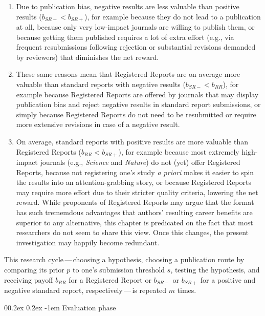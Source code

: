 \documentclass[british,,man,floatsintext]{apa6}
\makeatletter
\providecommand{\tightlist}{%
  \setlength{\itemsep}{0pt}\setlength{\parskip}{0pt}}
\renewcommand{\paragraph}{\@startsection{paragraph}{4}{\parindent}%
  {0\baselineskip \@plus 0.2ex \@minus 0.2ex}%
  {-1em}%
  {\normalfont\normalsize\bfseries\itshape\typesectitle}}
\makeatother
\begin{document}
\begin{enumerate}
\def\labelenumi{\arabic{enumi}.}
\tightlist
\item
  Due to publication bias, negative results are less valuable than positive results (\(b_{SR-} < b_{SR+}\)), for example because they do not lead to a publication at all, because only very low-impact journals are willing to publish them, or because getting them published requires a lot of extra effort (e.g., via frequent resubmissions following rejection or substantial revisions demanded by reviewers) that diminishes the net reward.
\item
  These same reasons mean that Registered Reports are on average more valuable than standard reports with negative results (\(b_{SR-} < b_{RR}\)), for example because Registered Reports are offered by journals that may display publication bias and reject negative results in standard report submissions, or simply because Registered Reports do not need to be resubmitted or require more extensive revisions in case of a negative result.
\item
  On average, standard reports with positive results are more valuable than Registered Reports (\(b_{RR} < b_{SR+}\)), for example because most extremely high-impact journals (e.g., \emph{Science} and \emph{Nature}) do not (yet) offer Registered Reports, because not registering one's study \emph{a priori} makes it easier to spin the results into an attention-grabbing story, or because Registered Reports may require more effort due to their stricter quality criteria, lowering the net reward.
  While proponents of Registered Reports may argue that the format has such trememdous advantages that authors' resulting career benefits are superior to any alternative, this chapter is predicated on the fact that most researchers do not seem to share this view.
  Once this changes, the present investigation may happily become redundant.
\end{enumerate}

This research cycle\(\,\)---\(\,\)choosing a hypothesis, choosing a publication route by comparing its prior \(p\) to one's submission threshold \(s\), testing the hypothesis, and receiving payoff \(b_{RR}\) for a Registered Report or \(b_{SR-}\) or \(b_{SR+}\) for a positive and negative standard report, respectively\(\,\)---\(\,\)is repeated \(m\) times.

\hypertarget{evaluation-phase}{%
\paragraph{Evaluation phase}\label{evaluation-phase}}
\end{document}
